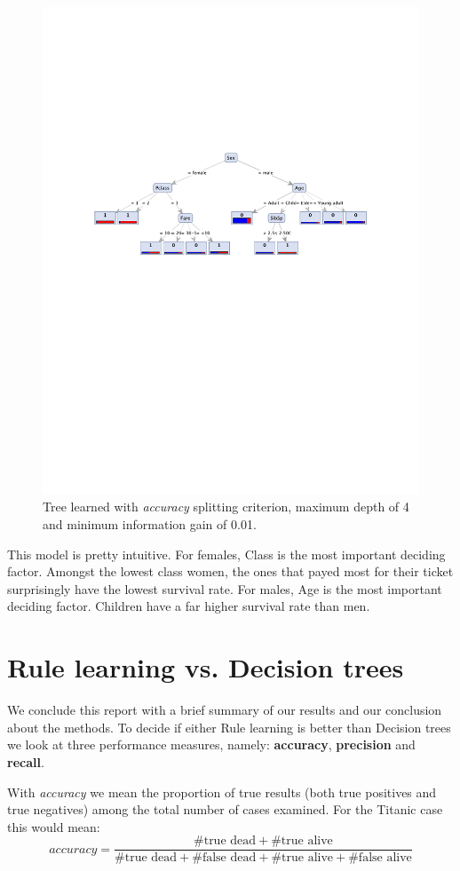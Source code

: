 \documentclass[11pt,a4paper]{article}
\begin{document}
\begin{figure}[htbp]
  \centering
  \includegraphics[width = .8\textwidth]{tree_final}
  \captionsetup{width=.8\textwidth}
  \caption{Tree learned with \emph{accuracy} splitting criterion, maximum depth of 4 and minimum information gain of 0.01.}
  \label{fig:tree_final}
\end{figure}
\par This model is pretty intuitive. For females, Class is the most important deciding factor. Amongst the lowest class women, the ones that payed most for their ticket surprisingly have the lowest survival rate. For males, Age is the most important deciding factor. Children have a far higher survival rate than men.

\section{Rule learning vs. Decision trees}

We conclude this report with a brief summary of our results and our conclusion about the methods.
To decide if either Rule learning is better than Decision trees we look at three performance measures, namely: \textbf{accuracy}, \textbf{precision} and \textbf{recall}.

With \emph{accuracy} we mean the proportion of true results (both true positives and true negatives) among the total number of cases examined.
For the Titanic case this would mean:
$$accuracy = \frac{\#\text{true dead} + \#\text{true alive} }{\#\text{true dead} + \#\text{false dead} + \#\text{true alive} + \#\text{false alive}}$$
\end{document}
